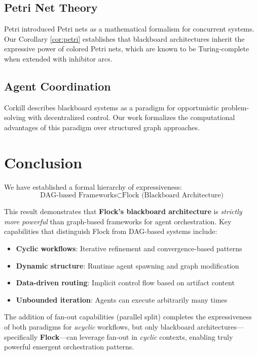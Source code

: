 \documentclass[11pt]{article}
\begin{document}
\subsection{Petri Net Theory}

Petri \cite{petri1962kommunikation} introduced Petri nets as a mathematical formalism for concurrent systems. Our Corollary \ref{cor:petri} establishes that blackboard architectures inherit the expressive power of colored Petri nets, which are known to be Turing-complete when extended with inhibitor arcs.

\subsection{Agent Coordination}

Corkill \cite{corkill1991blackboard} describes blackboard systems as a paradigm for opportunistic problem-solving with decentralized control. Our work formalizes the computational advantages of this paradigm over structured graph approaches.

\section{Conclusion}

We have established a formal hierarchy of expressiveness:
\[\text{DAG-based Frameworks} \subset \text{Flock (Blackboard Architecture)}\]

This result demonstrates that \textbf{Flock's blackboard architecture} is \emph{strictly more powerful} than graph-based frameworks for agent orchestration. Key capabilities that distinguish Flock from DAG-based systems include:

\begin{itemize}
    \item \textbf{Cyclic workflows}: Iterative refinement and convergence-based patterns
    \item \textbf{Dynamic structure}: Runtime agent spawning and graph modification
    \item \textbf{Data-driven routing}: Implicit control flow based on artifact content
    \item \textbf{Unbounded iteration}: Agents can execute arbitrarily many times
\end{itemize}

The addition of fan-out capabilities (parallel split) completes the expressiveness of both paradigms for \emph{acyclic} workflows, but only blackboard architectures---specifically \textbf{Flock}---can leverage fan-out in \emph{cyclic} contexts, enabling truly powerful emergent orchestration patterns.
\end{document}
